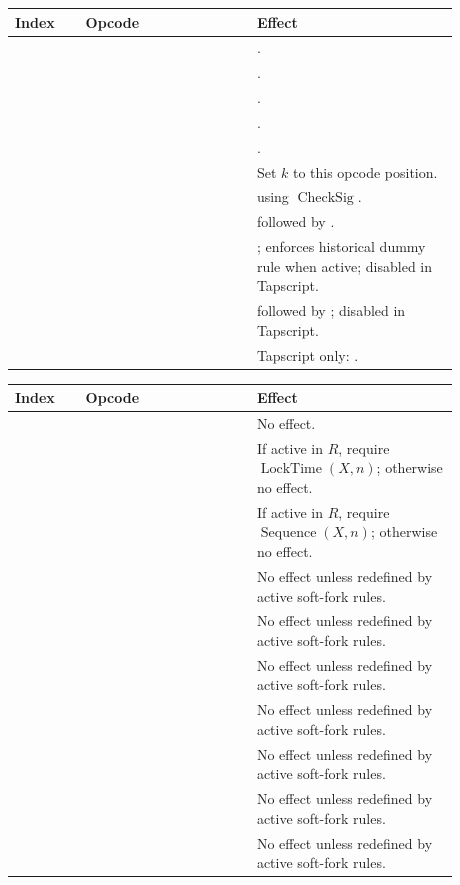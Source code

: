 \begin{longtable}{@{}L{0.14\linewidth}L{0.34\linewidth}L{0.40\linewidth}@{}}
\toprule
Index & Opcode & Effect \\
\midrule
{} &  & . \\
 &  & . \\
 &  & . \\
 &  & . \\
 &  & . \\
 &  & Set \(k\) to this opcode position. \\
 &  &  using \(\operatorname{CheckSig}\). \\
 &  &  followed by . \\
 &  & ; enforces historical dummy rule when active; disabled in Tapscript. \\
 &  &  followed by ; disabled in Tapscript. \\
 &  & Tapscript only: . \\
\bottomrule
\end{longtable}

\begin{longtable}{@{}L{0.14\linewidth}L{0.34\linewidth}L{0.40\linewidth}@{}}
\toprule
Index & Opcode & Effect \\
\midrule
{} &  & No effect. \\
 &  & If active in \(R\), require \(\operatorname{LockTime}(X,n)\); otherwise no effect. \\
 &  & If active in \(R\), require \(\operatorname{Sequence}(X,n)\); otherwise no effect. \\
 &  & No effect unless redefined by active soft-fork rules. \\
 &  & No effect unless redefined by active soft-fork rules. \\
 &  & No effect unless redefined by active soft-fork rules. \\
 &  & No effect unless redefined by active soft-fork rules. \\
 &  & No effect unless redefined by active soft-fork rules. \\
 &  & No effect unless redefined by active soft-fork rules. \\
 &  & No effect unless redefined by active soft-fork rules. \\
\bottomrule
\end{longtable}

